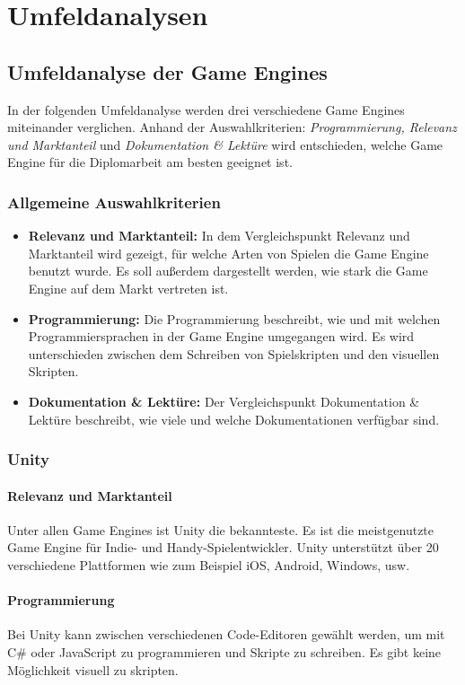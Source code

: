 \chapter{Umfeldanalysen}
\section{Umfeldanalyse der Game Engines}
In der folgenden Umfeldanalyse werden drei verschiedene Game Engines miteinander verglichen. Anhand der Auswahlkriterien: \textit{Programmierung, Relevanz und Marktanteil} und \textit{Dokumentation \& Lektüre} wird entschieden, welche Game Engine für die Diplomarbeit am besten geeignet ist.

\subsection{Allgemeine Auswahlkriterien}
\begin{itemize}
  \item \textbf{Relevanz und Marktanteil:} In dem Vergleichspunkt Relevanz und Marktanteil wird gezeigt, für welche Arten von Spielen die Game Engine benutzt wurde. Es soll außerdem dargestellt werden, wie stark die Game Engine auf dem Markt vertreten ist.
  \item \textbf{Programmierung:} Die Programmierung beschreibt, wie und mit welchen Programmiersprachen in der Game Engine umgegangen wird. Es wird unterschieden zwischen dem Schreiben von Spielskripten und den visuellen Skripten.
  \item \textbf{Dokumentation \& Lektüre:} Der Vergleichspunkt Dokumentation \& Lektüre beschreibt, wie viele und welche Dokumentationen verfügbar sind.
\end{itemize}

\pagebreak

\subsection{Unity}
\subsubsection{Relevanz und Marktanteil}
Unter allen Game Engines ist Unity die bekannteste. Es ist die meistgenutzte Game Engine für Indie- und Handy-Spielentwickler. Unity unterstützt über 20 verschiedene Plattformen wie zum Beispiel iOS, Android, Windows, usw.

\subsubsection{Programmierung}
Bei Unity kann zwischen verschiedenen Code-Editoren gewählt werden, um mit C\# oder JavaScript zu programmieren und Skripte zu schreiben. Es gibt keine Möglichkeit visuell zu skripten.

